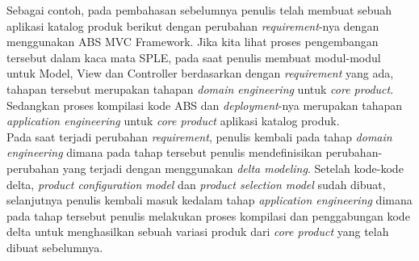 Sebagai contoh, pada pembahasan sebelumnya penulis telah membuat sebuah aplikasi katalog produk berikut dengan perubahan \textit{requirement}-nya dengan menggunakan ABS MVC Framework. Jika kita lihat proses pengembangan tersebut dalam kaca mata SPLE, pada saat penulis membuat modul-modul untuk Model, View dan Controller berdasarkan dengan \textit{requirement} yang ada, tahapan tersebut merupakan tahapan \textit{domain engineering} untuk \textit{core product}. Sedangkan proses kompilasi kode ABS dan \textit{deployment}-nya merupakan tahapan \textit{application engineering} untuk \textit{core product} aplikasi katalog produk.\\

Pada saat terjadi perubahan \textit{requirement}, penulis kembali pada tahap \textit{domain engineering} dimana pada tahap tersebut penulis mendefinisikan perubahan-perubahan yang terjadi dengan menggunakan \textit{delta modeling}. Setelah kode-kode delta, \textit{product configuration model} dan \textit{product selection model} sudah dibuat, selanjutnya penulis kembali masuk kedalam tahap \textit{application engineering} dimana pada tahap tersebut penulis melakukan proses kompilasi dan penggabungan kode delta untuk menghasilkan sebuah variasi produk dari \textit{core product} yang telah dibuat sebelumnya.